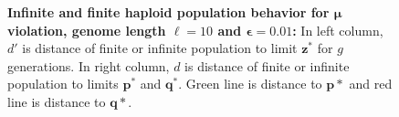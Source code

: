 \begin{figure}[h]
\begin{center}
\hspace{-3em}%
\vspace{-0.5em} \hspace{-3em}%
\caption[\textbf{Infinite and finite haploid population behavior for $\bm{\mu}$ violation, genome length $\ell = 10$ and $\bm{\epsilon} = 0.01$}]{\textbf{Infinite and finite haploid population behavior for $\bm{\mu}$ violation, genome length $\ell = 10$ and $\bm{\epsilon} = 0.01$:} 
  In left column, $d'$ is distance of finite or infinite population to limit $\bm{z}^\ast$ for $g$ generations. In right column, $d$ is distance of finite or infinite population to limits $\bm{p}^\ast$ and $\bm{q}^\ast$. Green line is distance to $\bm{p*}$ and red line is distance to $\bm{q*}$.}
\label{oscillation_10h_vio_mu_0.01}
\end{center}
\end{figure}

